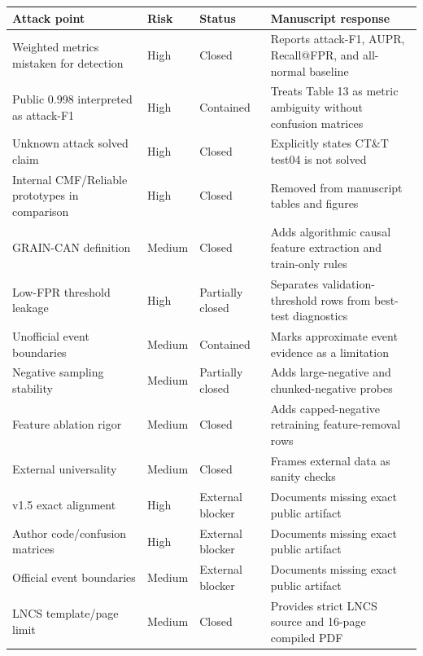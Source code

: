 \begin{tabular}{llll}
\hline
Attack point & Risk & Status & Manuscript response\\
\hline
Weighted metrics mistaken for detection & High & Closed & Reports attack-F1, AUPR, Recall@FPR, and all-normal baseline\\
Public 0.998 interpreted as attack-F1 & High & Contained & Treats Table 13 as metric ambiguity without confusion matrices\\
Unknown attack solved claim & High & Closed & Explicitly states CT\&T test04 is not solved\\
Internal CMF/Reliable prototypes in comparison & High & Closed & Removed from manuscript tables and figures\\
GRAIN-CAN definition & Medium & Closed & Adds algorithmic causal feature extraction and train-only rules\\
Low-FPR threshold leakage & High & Partially closed & Separates validation-threshold rows from best-test diagnostics\\
Unofficial event boundaries & Medium & Contained & Marks approximate event evidence as a limitation\\
Negative sampling stability & Medium & Partially closed & Adds large-negative and chunked-negative probes\\
Feature ablation rigor & Medium & Closed & Adds capped-negative retraining feature-removal rows\\
External universality & Medium & Closed & Frames external data as sanity checks\\
v1.5 exact alignment & High & External blocker & Documents missing exact public artifact\\
Author code/confusion matrices & High & External blocker & Documents missing exact public artifact\\
Official event boundaries & Medium & External blocker & Documents missing exact public artifact\\
LNCS template/page limit & Medium & Closed & Provides strict LNCS source and 16-page compiled PDF\\
\hline
\end{tabular}
